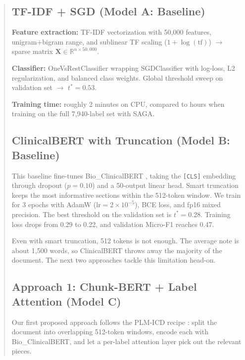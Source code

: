 \documentclass[11pt,a4paper]{article}
\begin{document}
\begin{abstract}
\subsection{TF-IDF + SGD (Model A: Baseline)}

\textbf{Feature extraction:} TF-IDF vectorization with 50,000 features, unigram+bigram range, and sublinear TF scaling ($1 + \log(\text{tf})$) $\rightarrow$ sparse matrix $\mathbf{X} \in \mathbb{R}^{n \times 50{,}000}$.

\textbf{Classifier:} OneVsRestClassifier wrapping SGDClassifier with log-loss, L2 regularization, and balanced class weights. Global threshold sweep on validation set $\rightarrow$ $t^* = 0.53$.

\textbf{Training time:} roughly 2 minutes on CPU, compared to hours when training on the full 7,940-label set with SAGA.

\subsection{ClinicalBERT with Truncation (Model B: Baseline)}

This baseline fine-tunes Bio\_ClinicalBERT \cite{alsentzer2019publicly}, taking the \texttt{[CLS]} embedding through dropout ($p = 0.10$) and a 50-output linear head. Smart truncation keeps the most informative sections within the 512-token window. We train for 3 epochs with AdamW ($\text{lr} = 2\times10^{-5}$), BCE loss, and fp16 mixed precision. The best threshold on the validation set is $t^* = 0.28$. Training loss drops from 0.29 to 0.22, and validation Micro-F1 reaches 0.47.

Even with smart truncation, 512 tokens is not enough. The average note is about 1,500 words, so ClinicalBERT throws away the majority of the document. The next two approaches tackle this limitation head-on.

\subsection{Approach 1: Chunk-BERT + Label Attention (Model C)}
\label{sec:chunk_bert}

Our first proposed approach follows the PLM-ICD recipe \cite{huang2022plmicd}: split the document into overlapping 512-token windows, encode each with Bio\_ClinicalBERT, and let a per-label attention layer pick out the relevant pieces.


\end{abstract}
\end{document}
